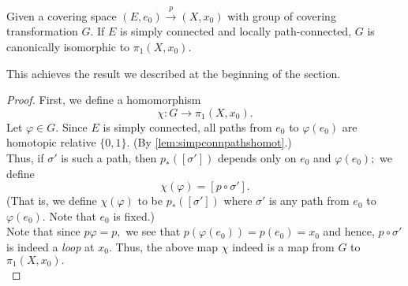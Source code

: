 \documentclass[12pt]{article}
\begin{document}
\begin{thm} \label{thm:covtransiso}
	Given a covering space $(E, e_0) \overset{p}{\longrightarrow} (X, x_0)$ with group of covering transformation $G.$ If $E$ is simply connected and locally path-connected, $G$ is canonically isomorphic to $\pi_1(X, x_0).$
\end{thm}
This achieves the result we described at the beginning of the section.
\begin{proof} 
	First, we define a homomorphism 
	\begin{equation*} 
		\chi:G \to \pi_1(X, x_0).
	\end{equation*}
	Let $\varphi \in G.$ Since $E$ is simply connected, all paths from $e_0$ to $\varphi(e_0)$ are homotopic relative $\{0, 1\}.$ (By \cref{lem:simpconnpathshomot}.)\\
	Thus, if $\sigma'$ is such a path, then $p_*([\sigma'])$ depends only on $e_0$ and $\varphi(e_0);$ we define
	\begin{equation*} 
		\chi(\varphi) = [p \circ \sigma'].
	\end{equation*}
	(That is, we define $\chi(\varphi)$ to be $p_*([\sigma'])$ where $\sigma'$ is any path from $e_0$ to $\varphi(e_0).$ Note that $e_0$ is fixed.)\\
	Note that since $p\varphi = p,$ we see that $p(\varphi(e_0)) = p(e_0) = x_0$ and hence, $p\circ \sigma'$ is indeed a \emph{loop} at $x_0.$ Thus, the above map $\chi$ indeed is a map from $G$ to $\pi_1(X, x_0).$\\
	

\end{proof}
\end{document}
